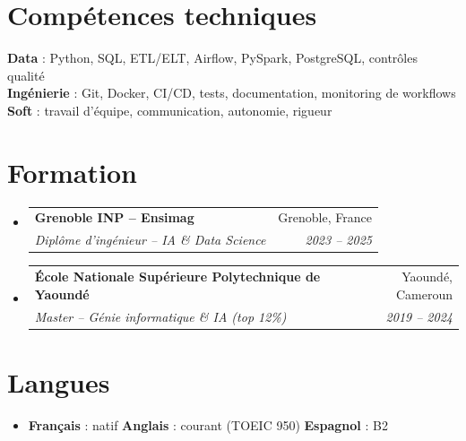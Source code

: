 \documentclass[a4paper,10.5pt]{article}
\makeatletter
\newcommand{\resumeSubheading}[4]{
  \vspace{3pt}\item
  \begin{tabular*}{0.97\textwidth}[t]{l@{\extracolsep{\fill}}r}
    \textbf{#1} & #2 \\
    \textit{\small #3} & \textit{\small #4} \\
  \end{tabular*}\vspace{1pt}
}
\newcommand{\resumeSubHeadingListStart}{\begin{itemize}[leftmargin=0.08in, label={}]}
\newcommand{\resumeSubHeadingListEnd}{\end{itemize}}
\makeatother
\begin{document}
\section{Comp\'etences techniques}
\begin{itemize}[leftmargin=0.08in, label={}]
  \small{\item{
    \textbf{Data} : Python, SQL, ETL/ELT, Airflow, PySpark, PostgreSQL, contr\^oles qualit\'e \\
    \textbf{Ing\'enierie} : Git, Docker, CI/CD, tests, documentation, monitoring de workflows \\
    \textbf{Soft} : travail d'\'equipe, communication, autonomie, rigueur
  }}
\end{itemize}

\section{Formation}
\resumeSubHeadingListStart
  \resumeSubheading
    {Grenoble INP -- Ensimag}{Grenoble, France}
    {Dipl\^ome d'ing\'enieur -- IA \& Data Science}{2023 -- 2025}
  \resumeSubheading
    {\'Ecole Nationale Sup\'erieure Polytechnique de Yaound\'e}{Yaound\'e, Cameroun}
    {Master -- G\'enie informatique \& IA (top 12\%)}{2019 -- 2024}
\resumeSubHeadingListEnd

\section{Langues}
\begin{itemize}[leftmargin=0.08in, label={}]
  \item \textbf{Fran\c{c}ais} : natif \quad \textbf{Anglais} : courant (TOEIC 950) \quad \textbf{Espagnol} : B2
\end{itemize}
\end{document}
